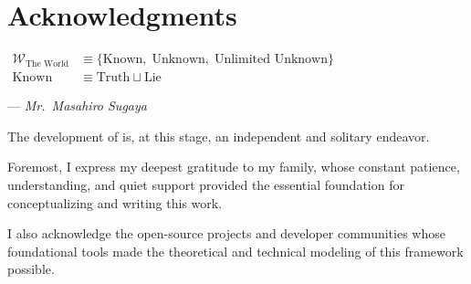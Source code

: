 \chapter*{Acknowledgments}
\label{chap:acknowledgments}
\epigraph{%
  $\begin{aligned}
    \mathcal{W}_{\text{The World}} &\equiv \{\text{Known},\;\text{Unknown},\;\text{Unlimited Unknown}\} \\
    \text{Known} &\equiv \text{Truth} \sqcup \text{Lie}
  \end{aligned}$
}{%
  --- \textit{Mr.~Masahiro Sugaya}
}

The development of \textbf{\exSNLP} is, at this stage, an independent and solitary endeavor. 

Foremost, I express my deepest gratitude to my family, whose constant patience, understanding, and quiet support provided the essential foundation for conceptualizing and writing this work. 

I also acknowledge the open-source projects and developer communities whose foundational tools made the theoretical and technical modeling of this framework possible.
